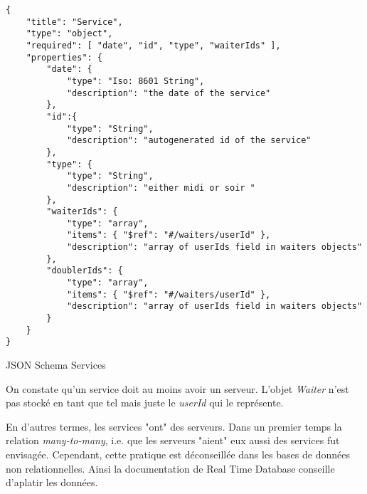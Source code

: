 \begin{listing}[!h]
\begin{verbatim}
{
    "title": "Service",
    "type": "object",
    "required": [ "date", "id", "type", "waiterIds" ],
    "properties": {
        "date": {
            "type": "Iso: 8601 String",
            "description": "the date of the service"
        },
        "id":{
            "type": "String",
            "description": "autogenerated id of the service"
        },
        "type": {
            "type": "String",
            "description": "either midi or soir "
        },
        "waiterIds": {
            "type": "array",
            "items": { "$ref": "#/waiters/userId" },
            "description": "array of userIds field in waiters objects"
        },
        "doublerIds": {
            "type": "array",
            "items": { "$ref": "#/waiters/userId" },
            "description": "array of userIds field in waiters objects"
        }
    }
}
\end{verbatim}
\caption{JSON Schema Services}
\label{schema:services}
\end{listing}

On constate qu'un service doit au moins avoir un serveur. L'objet \textit{Waiter} n'est pas stocké en tant que tel mais juste le \textit{userId} qui le représente. 

En d'autres termes, les services "ont" des serveurs. Dans un premier temps la relation \textit{many-to-many}, i.e. que les serveurs "aient" eux aussi des services fut envisagée. Cependant, cette pratique est déconseillée dans les bases de données non relationnelles. Ainsi la documentation de Real Time Database conseille d'aplatir les données. 
\newpage
